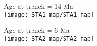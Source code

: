 \documentclass[reviewcopy]{elsart}
\renewcommand{\includegraphics}[2][]{\fbox{#2}}
\providecommand{\DIFaddbeginFL}{} %
\providecommand{\DIFaddendFL}{} %
\providecommand{\DIFdelbeginFL}{} %
\providecommand{\DIFdelendFL}{} %
\begin{document}
\begin{figure}
\DIFaddendFL \begin{minipage}[t]{0.49\textwidth}
{ Age at trench = 14 Ma} \\
\DIFdelbeginFL %
\DIFdelendFL \DIFaddbeginFL \texttt{[image: STA1-map/STA1-map]}
\DIFaddendFL \end{minipage}\hfill%
\begin{minipage}[t]{0.49\textwidth}
{  Age at trench = 6 Ma} \\
\DIFdelbeginFL %
\DIFdelendFL \DIFaddbeginFL \texttt{[image: STA2-map/STA2-map]}
\DIFaddendFL \end{minipage}


\end{figure}
\end{document}
